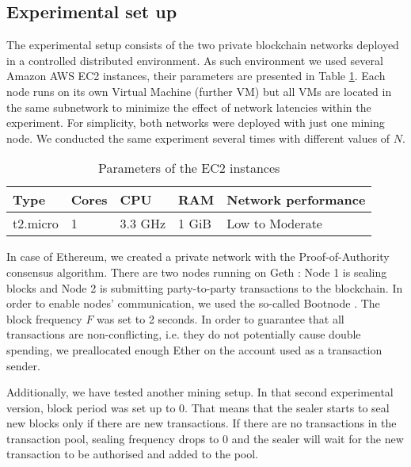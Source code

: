 \subsection{Experimental set up}

The experimental setup consists of the two private blockchain networks deployed in a controlled distributed environment. As such environment we used several Amazon AWS EC2 instances, their parameters are presented in Table \ref{instance_params}. Each node runs on its own Virtual Machine (further VM) but all VMs are located in the same subnetwork to minimize the effect of network latencies within the experiment. For simplicity, both networks were deployed with just one mining node. We conducted the same experiment several times with different values of $N$.

\begin{table}[ht]
    \centering
    \begin{tabular}{|l|l|l|l|l|}
        \hline
        Type & Cores & CPU & RAM & Network performance \\
        \hline
        t2.micro & 1 & 3.3 GHz & 1 GiB & Low to Moderate \\
        \hline
    \end{tabular}
    \caption{Parameters of the EC2 instances \cite{ec2_params}}
    \label{instance_params}
\end{table}

In case of Ethereum, we created a private network with the Proof-of-Authority consensus algorithm. There are two nodes running on Geth \cite{geth}: Node 1 is sealing blocks and Node 2 is submitting party-to-party transactions to the blockchain. In order to enable nodes’ communication, we used the so-called Bootnode \cite{bootnode}. The block frequency $F$ was set to 2 seconds. In order to guarantee that all transactions are non-conflicting, i.e. they do not potentially cause double spending, we preallocated enough Ether on the account used as a transaction sender.

Additionally, we have tested another mining setup. In that second experimental version, block period was set up to 0. That means that the sealer starts to seal new blocks only if there are new transactions. If there are no transactions in the transaction pool, sealing frequency drops to 0 and the sealer will wait for the new transaction to be authorised and added to the pool. 
